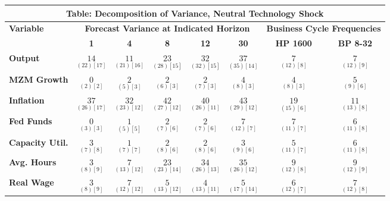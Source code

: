 \documentclass{article}
\begin{document}
 \begin{tabular}{|l|c|@{}c|c|@{}c|c|@{}c|c|} 
 \hline 
 \multicolumn{8}{|c|}{\textbf{Table: Decomposition of Variance, Neutral Technology Shock}} \\ \hline 
 \textbf{Variable} & \multicolumn{5}{|c}{\textbf{Forecast Variance at 
 Indicated Horizon}} & \multicolumn{2}{|c|}{\textbf{Business Cycle 
 Frequencies}} \\ \cline{2-8} 
 & \textbf{1} & \textbf{4} & \textbf{8} & \textbf{12} & \textbf{30} & \textbf{%
 HP 1600} & \textbf{BP 8-32} \\ \hline\hline 
 \textbf{Output} & $\underset{( 22) [ 17]}{ 14}$ & $\underset{( 21) [ 16]}{ 11}$ & $\underset{( 28) [ 15]}{ 23}$ & $\underset{( 32) [ 15]}{ 32}$ & $\underset{( 35) [ 14]}{ 37}$ & $\underset{( 12) [  8]}{  7}$ & $\underset{( 12) [  9]}{  7}$ \\ \hline 
 \textbf{MZM Growth} & $\underset{(  2) [  2]}{  0}$ & $\underset{(  5) [  3]}{  2}$ & $\underset{(  6) [  3]}{  2}$ & $\underset{(  7) [  3]}{  2}$ & $\underset{(  8) [  3]}{  4}$ & $\underset{(  8) [  3]}{  4}$ & $\underset{(  9) [  6]}{  5}$ \\ \hline 
 \textbf{Inflation} & $\underset{( 26) [ 17]}{ 37}$ & $\underset{( 23) [ 12]}{ 32}$ & $\underset{( 27) [ 12]}{ 42}$ & $\underset{( 26) [ 11]}{ 40}$ & $\underset{( 29) [ 12]}{ 43}$ & $\underset{( 15) [  6]}{ 19}$ & $\underset{( 13) [  8]}{ 11}$ \\ \hline 
 \textbf{Fed Funds} & $\underset{(  3) [  3]}{  0}$ & $\underset{(  5) [  5]}{  1}$ & $\underset{(  7) [  6]}{  2}$ & $\underset{(  7) [  6]}{  2}$ & $\underset{( 12) [  7]}{  7}$ & $\underset{( 11) [  7]}{  7}$ & $\underset{( 11) [  8]}{  6}$ \\ \hline 
 \textbf{Capacity Util.} & $\underset{(  7) [  8]}{  3}$ & $\underset{(  7) [  7]}{  1}$ & $\underset{(  8) [  6]}{  2}$ & $\underset{(  8) [  6]}{  2}$ & $\underset{(  9) [  6]}{  3}$ & $\underset{( 11) [  7]}{  5}$ & $\underset{( 11) [  8]}{  6}$ \\ \hline 
 \textbf{Avg. Hours} & $\underset{(  8) [  9]}{  3}$ & $\underset{( 13) [ 12]}{  7}$ & $\underset{( 23) [ 14]}{ 23}$ & $\underset{( 26) [ 13]}{ 34}$ & $\underset{( 26) [ 12]}{ 35}$ & $\underset{( 12) [  8]}{  9}$ & $\underset{( 12) [  9]}{  9}$ \\ \hline 
 \textbf{Real Wage} &  $\underset{(  8) [  9]}{  3}$ & $\underset{( 12) [ 12]}{  7}$ & $\underset{( 13) [ 12]}{  5}$ & $\underset{( 13) [ 11]}{  4}$ & $\underset{( 17) [ 14]}{  5}$ & $\underset{( 12) [  7]}{  6}$ & $\underset{( 12) [  8]}{  7}$ \\ \hline 

\end{tabular}
\end{document}
